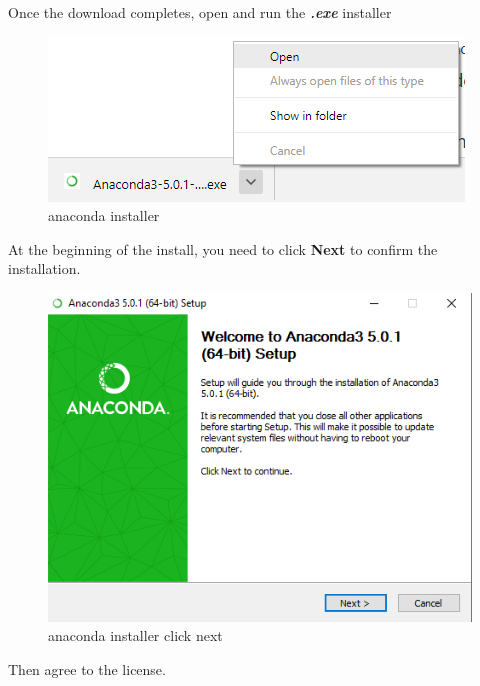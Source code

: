 \documentclass{book}
\makeatletter
\def\maxwidth{\ifdim\Gin@nat@width>\linewidth\linewidth
    \else\Gin@nat@width\fi}
\let\Oldincludegraphics\includegraphics
\renewcommand{\includegraphics}[1]{\Oldincludegraphics[width=.8\maxwidth]{#1}}
\makeatother
\begin{document}
Once the download completes, open and run the \textbf{\emph{.exe}}
installer

\begin{figure}
\centering
\includegraphics{images/anaconda_run_installer.png}
\caption{anaconda installer}
\end{figure}

At the beginning of the install, you need to click \textbf{Next} to
confirm the installation.

\begin{figure}
\centering
\includegraphics{images/anaconda_installer_click_next.png}
\caption{anaconda installer click next}
\end{figure}

Then agree to the license.
\end{document}
